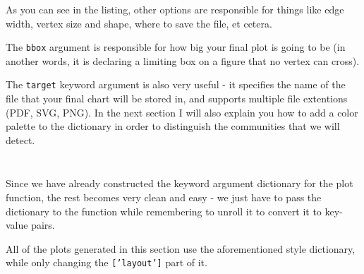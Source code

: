 \documentclass[12pt, a4paper]{article}
\begin{document}
As you can see in the listing, other options are responsible for things like edge width, vertex size and shape, where to save the file, et cetera.

The \texttt{bbox} argument is responsible for how big your final plot is going to be (in another words, it is declaring a limiting box on a figure that no vertex can cross).

The \texttt{target} keyword argument is also very useful - it specifies the name of the file that your final chart will be stored in, and supports multiple file extentions (PDF, SVG, PNG).  In the next section I will also explain you how to add a color palette to the dictionary in order to distinguish the communities that we will detect.

\bgroup
  \inputminted[linenos, breaklines=true, fontsize=\scriptsize, firstnumber=last]{python}{src/youtube/hdg/2_style_dict.py}
  \label{listing:iplot_2sd}
\egroup


\bgroup
  \inputminted[linenos, breaklines=true, fontsize=\scriptsize, firstnumber=last]{python}{src/youtube/hdg/3_plotting.py}
  \label{listing:iplot_3im}
\egroup

Since we have already constructed the keyword argument dictionary for the plot function, the rest becomes very clean and easy - we just have to pass the dictionary to the function while remembering to unroll it to convert it to key-value pairs.


All of the plots generated in this section use the aforementioned style dictionary, while only changing the \texttt{['layout']} part of it.
\end{document}
